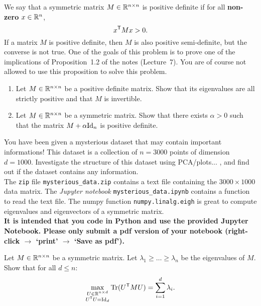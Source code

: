 \documentclass[11pt,nocut]{article}
\begin{document}
\begin{problem}[3 points]
	We say that a symmetric matrix $M \in \mathbb{R}^{n \times n}$ is positive definite if for all \textbf{non-zero} $x \in \mathbb{R}^n$,
	$$
	x^{{\sf T}} M x > 0.
	$$
	If a matrix $M$ is positive definite, then $M$ is also positive semi-definite, but the converse is not true. One of the goals of this problem is to prove one of the implications of Proposition~1.2 of the notes (Lecture~7). You are of course not allowed to use this proposition to solve this problem.
	\begin{enumerate}[label=\normalfont(\textbf{\alph*})]
		\item Let $M \in \mathbb{R}^{n \times n}$ be a positive definite matrix. Show that its eigenvalues are all strictly positive and that $M$ is invertible. 
		\item Let $M \in \mathbb{R}^{n \times n}$ be a symmetric matrix. Show that there exists $\alpha > 0$ such that the matrix $M + \alpha {{\rm Id}}_n$ is positive definite.
	\end{enumerate}
\end{problem}

\vspace{1mm}


\begin{problem}[4 points]
	You have been given a mysterious dataset that may contain important informations! This dataset is a collection of $n=3000$ points of dimension $d=1000$.
	Investigate the structure of this dataset using PCA/plots... , and find out if the dataset contains any information.
	\\

	The \texttt{zip} file \texttt{mysterious\_data.zip} contains a text file containing the $3000 \times 1000$ data matrix.
	The \emph{Jupyter notebook} \texttt{mysterious\_data.ipynb} contains a function to read the text file.
	The numpy function \texttt{numpy.linalg.eigh} is great to compute eigenvalues and eigenvectors of a symmetric matrix. 
	\\

	\textbf{It is intended that you code in Python and use the provided Jupyter Notebook. Please only submit a pdf version of your notebook (right-click $\to$ `print' $\to$ `Save as pdf').}
\end{problem}


\vspace{1mm}




\begin{problem}[$\star$]
	Let $M \in \mathbb{R}^{n \times n}$ be a symmetric matrix. Let $\lambda_1 \geq \dots \geq \lambda_n$ be the eigenvalues of $M$. Show that for all $d \leq n$:
	$$
	\max_{\substack{U \in \mathbb{R}^{n\times d} \\ U^{{\sf T}} U = {{\rm Id}}_d}} {{\rm Tr}}(U^{{\sf T}} M U) = \sum_{i=1}^d \lambda_i.
	$$
\end{problem}
\vspace{1cm}
\centerline{}

%
%
\end{document}
